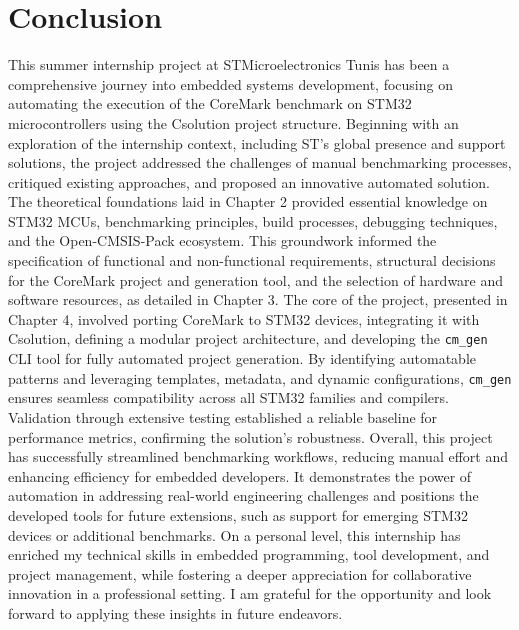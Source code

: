 \chapter*{Conclusion}

This summer internship project at STMicroelectronics Tunis has been a comprehensive journey into embedded systems development, focusing on automating the execution of the CoreMark benchmark on STM32 microcontrollers using the Csolution project structure. Beginning with an exploration of the internship context, including ST's global presence and support solutions, the project addressed the challenges of manual benchmarking processes, critiqued existing approaches, and proposed an innovative automated solution.
The theoretical foundations laid in Chapter 2 provided essential knowledge on STM32 MCUs, benchmarking principles, build processes, debugging techniques, and the Open-CMSIS-Pack ecosystem. This groundwork informed the specification of functional and non-functional requirements, structural decisions for the CoreMark project and generation tool, and the selection of hardware and software resources, as detailed in Chapter 3.
The core of the project, presented in Chapter 4, involved porting CoreMark to STM32 devices, integrating it with Csolution, defining a modular project architecture, and developing the \texttt{cm\_gen} CLI tool for fully automated project generation. By identifying automatable patterns and leveraging templates, metadata, and dynamic configurations, \texttt{cm\_gen} ensures seamless compatibility across all STM32 families and compilers. Validation through extensive testing established a reliable baseline for performance metrics, confirming the solution's robustness.
Overall, this project has successfully streamlined benchmarking workflows, reducing manual effort and enhancing efficiency for embedded developers. It demonstrates the power of automation in addressing real-world engineering challenges and positions the developed tools for future extensions, such as support for emerging STM32 devices or additional benchmarks.
On a personal level, this internship has enriched my technical skills in embedded programming, tool development, and project management, while fostering a deeper appreciation for collaborative innovation in a professional setting. I am grateful for the opportunity and look forward to applying these insights in future endeavors.
